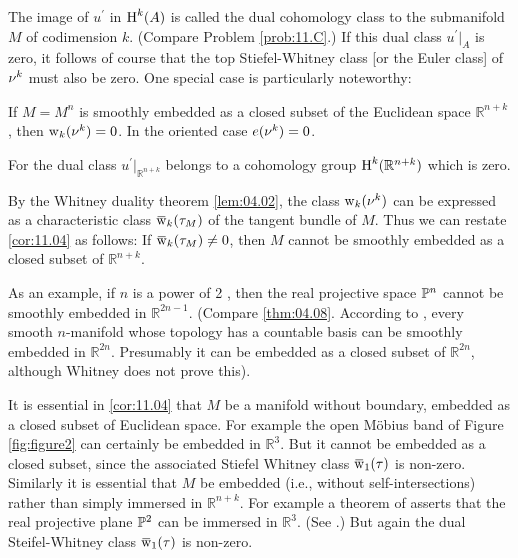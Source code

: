 \documentclass[../main]{subfiles}
\begin{document}
\begin{definition}The image of $u^{\prime}$ in $\operatorname{H}^{k}(A)$ is called the dual cohomology class to the submanifold $M$ of codimension $k$. (Compare Problem \ref{prob:11.C}.) If this dual class $u^{\prime}|_A$ is zero, it follows of course that the top Stiefel-Whitney class [or the Euler class] of $\nu_{}^{k}$ must also be zero. One special case is particularly noteworthy:
\begin{corollary}\label{cor:11.04}
 If $M=M^{n}$ is smoothly embedded as a closed subset of the Euclidean space $\mathbb{R}^{n+k}$, then $\operatorname{w}_{k}(\nu_{}^{k})=0$. In the oriented case $e(\nu_{}^{k})=0$.
\end{corollary}
For the dual class $u^{\prime}|_{\mathbb{R}^{n+k}}$ belongs to a cohomology group $\operatorname{H}^{k}(\mathbb{R}^{n+k})$ which is zero.\end{definition} 

By the Whitney duality theorem \ref{lem:04.02}, the class $\operatorname{w}_{k}(\nu_{}^{k})$ can be expressed as a characteristic class $\xoverline{\sw}_{k}(\tau_{M})$ of the tangent bundle of $M$. Thus we can restate \ref{cor:11.04} as follows: If $\xoverline{\sw}_{k}(\tau_{M}) \neq 0$, then $M$ cannot be smoothly embedded as a closed subset of $\mathbb{R}^{n+k}$.

As an example, if $n$ is a power of 2 , then the real projective space $\mathbb{P}^{n}$ cannot be smoothly embedded in $\mathbb{R}^{2 n-1}$. (Compare \ref{thm:04.08}. According to \cite{whitney1944}, every smooth $n$-manifold whose topology has a countable basis can be smoothly embedded in $\mathbb{R}^{2 n}$. Presumably it can be embedded as a closed subset of $\mathbb{R}^{2 n}$, although Whitney does not prove this).

\begin{remark}It is essential in \ref{cor:11.04} that $M$ be a manifold without boundary, embedded as a closed subset of Euclidean space. For example the open M\"obius band of Figure \ref{fig:figure2} can certainly be embedded in $\mathbb{R}^{3}$. But it cannot be embedded as a closed subset, since the associated Stiefel Whitney class $\xoverline{\sw}_{1}(\tau)$ is non-zero. Similarly it is essential that $M$ be embedded (i.e., without self-intersections) rather than simply immersed in $\mathbb{R}^{n+k}$. For example a theorem of \cite{Boy1903} asserts that the real projective plane $\mathbb{P}^{2}$ can be immersed in $\mathbb{R}^{3}$. (See \cite{hilbert1999geometry}.) But again the dual Steifel-Whitney class $\xoverline{\sw}_{1}(\tau)$ is non-zero.
\end{remark} 
\end{document}

